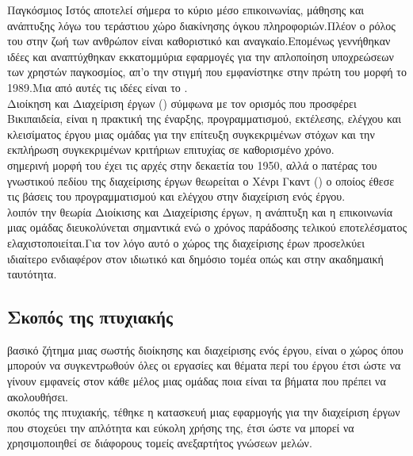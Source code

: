  Παγκόσμιος Ιστός αποτελεί σήμερα το κύριο μέσο επικοινωνίας, μάθησης και ανάπτυξης λόγω του τεράστιου χώρο διακίνησης όγκου πληροφοριών.Πλέον ο ρόλος του στην ζωή των ανθρώπον είναι καθοριστικό και αναγκαίο.Επομένως γεννήθηκαν ιδέες και αναπτύχθηκαν εκκατομμύρια εφαρμογές για την απλοποίηση υποχρεώσεων των χρηστών παγκοσμίος, απ'ο την στιγμή που εμφανίστηκε στην πρώτη του μορφή το 1989.Μια από αυτές τις ιδέες είναι το .\\
 Διοίκηση και Διαχείριση έργων () σύμφωνα με τον ορισμός που προσφέρει Βικιπαιδεία, είναι η πρακτική της έναρξης, προγραμματισμού, εκτέλεσης, ελέγχου και κλεισίματος έργου μιας ομάδας για την επίτευξη συγκεκριμένων στόχων και την εκπλήρωση συγκεκριμένων κριτήριων επιτυχίας σε καθορισμένο χρόνο.\\
 σημερινή μορφή του  έχει τις αρχές στην δεκαετία του 1950, αλλά ο πατέρας του γνωστικού πεδίου της διαχείρισης έργων θεωρείται ο Χένρι Γκαντ () ο οποίος έθεσε τις βάσεις του προγραμματισμού και ελέγχου στην διαχείριση ενός έργου.\\
 λοιπόν την θεωρία Διοίκισης και Διαχείρισης έργων, η ανάπτυξη και η επικοινωνία μιας ομάδας διευκολύνεται σημαντικά ενώ ο χρόνος παράδοσης τελικού εποτελέσματος ελαχιστοποιείται.Για τον λόγο αυτό ο χώρος της διαχείρισης έρων προσελκύει ιδιαίτερο ενδιαφέρον στον ιδιωτικό και δημόσιο τομέα οπώς και στην ακαδημαική ταυτότητα.

\subsection*{Σκοπός της πτυχιακής}
 βασικό ζήτημα μιας σωστής διοίκησης και διαχείρισης ενός έργου, είναι ο χώρος όπου μπορούν να συγκεντρωθούν όλες οι εργασίες και θέματα περί του έργου έτσι ώστε να γίνουν εμφανείς στον κάθε μέλος μιας ομάδας ποια είναι τα βήματα που πρέπει να ακολουθήσει.\\
 σκοπός της πτυχιακής, τέθηκε η κατασκευή μιας εφαρμογής για την διαχείριση έργων που στοχεύει την απλότητα και εύκολη χρήσης της, έτσι ώστε να μπορεί να χρησιμοποιηθεί σε διάφορους τομείς ανεξαρτήτος γνώσεων μελών.

